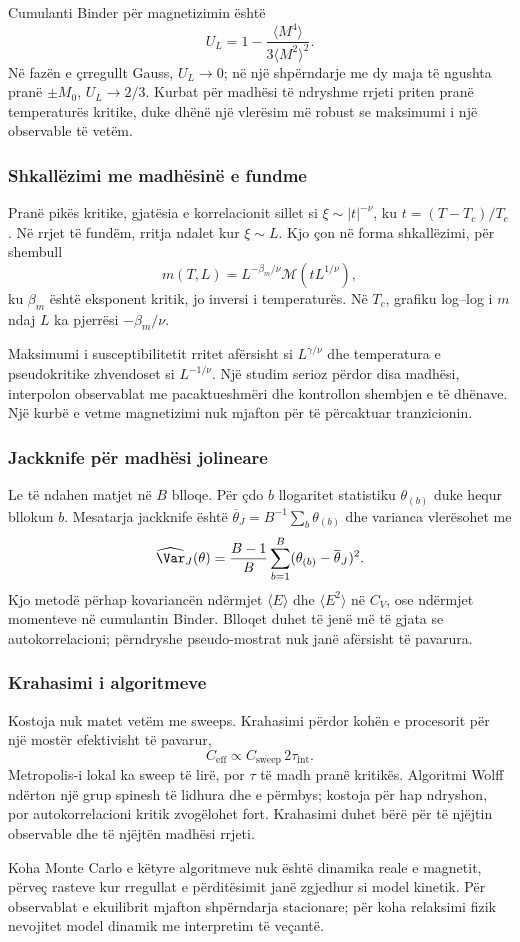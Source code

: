 Cumulanti Binder për magnetizimin është
\begin{equation}
 U_L=1-\frac{\langle M^4\rangle}{3\langle M^2\rangle^2}.
\end{equation}
Në fazën e çrregullt Gauss, $U_L\to0$; në një shpërndarje me dy maja të ngushta pranë $\pm M_0$, $U_L\to2/3$. Kurbat për madhësi të ndryshme rrjeti priten pranë temperaturës kritike, duke dhënë një vlerësim më robust se maksimumi i një observable të vetëm.

\subsubsection{Shkallëzimi me madhësinë e fundme}
Pranë pikës kritike, gjatësia e korrelacionit sillet si $\xi\sim|t|^{-\nu}$, ku $t=(T-T_c)/T_c$. Në rrjet të fundëm, rritja ndalet kur $\xi\sim L$. Kjo çon në forma shkallëzimi, për shembull
\begin{equation}
 m(T,L)=L^{-\beta_m/\nu}\mathcal M(tL^{1/\nu}),
\end{equation}
ku $\beta_m$ është eksponent kritik, jo inversi i temperaturës. Në $T_c$, grafiku log--log i $m$ ndaj $L$ ka pjerrësi $-\beta_m/\nu$.

Maksimumi i susceptibilitetit rritet afërsisht si $L^{\gamma/\nu}$ dhe temperatura e pseudokritike zhvendoset si $L^{-1/\nu}$. Një studim serioz përdor disa madhësi, interpolon observablat me pacaktueshmëri dhe kontrollon shembjen e të dhënave. Një kurbë e vetme magnetizimi nuk mjafton për të përcaktuar tranzicionin.

\subsubsection{Jackknife për madhësi jolineare}
Le të ndahen matjet në $B$ blloqe. Për çdo $b$ llogaritet statistiku $\theta_{(b)}$ duke hequr bllokun $b$. Mesatarja jackknife është $\overline\theta_J=B^{-1}\sum_b\theta_{(b)}$ dhe varianca vlerësohet me
\begin{equation}
 \widehat{\Var}_J(\theta)=\frac{B-1}{B}
 \sum_{b=1}^{B}(\theta_{(b)}-\overline\theta_J)^2.
\end{equation}
Kjo metodë përhap kovariancën ndërmjet $\langle E\rangle$ dhe $\langle E^2\rangle$ në $C_V$, ose ndërmjet momenteve në cumulantin Binder. Blloqet duhet të jenë më të gjata se autokorrelacioni; përndryshe pseudo-mostrat nuk janë afërsisht të pavarura.

\subsubsection{Krahasimi i algoritmeve}
Kostoja nuk matet vetëm me sweeps. Krahasimi përdor kohën e procesorit për një mostër efektivisht të pavarur,
\begin{equation}
 C_{\mathrm{eff}}\propto C_{\mathrm{sweep}}\,2\tau_{\mathrm{int}}.
\end{equation}
Metropolis-i lokal ka sweep të lirë, por $\tau$ të madh pranë kritikës. Algoritmi Wolff ndërton një grup spinesh të lidhura dhe e përmbys; kostoja për hap ndryshon, por autokorrelacioni kritik zvogëlohet fort. Krahasimi duhet bërë për të njëjtin observable dhe të njëjtën madhësi rrjeti.

Koha Monte Carlo e këtyre algoritmeve nuk është dinamika reale e magnetit, përveç rasteve kur rregullat e përditësimit janë zgjedhur si model kinetik. Për observablat e ekuilibrit mjafton shpërndarja stacionare; për koha relaksimi fizik nevojitet model dinamik me interpretim të veçantë.
